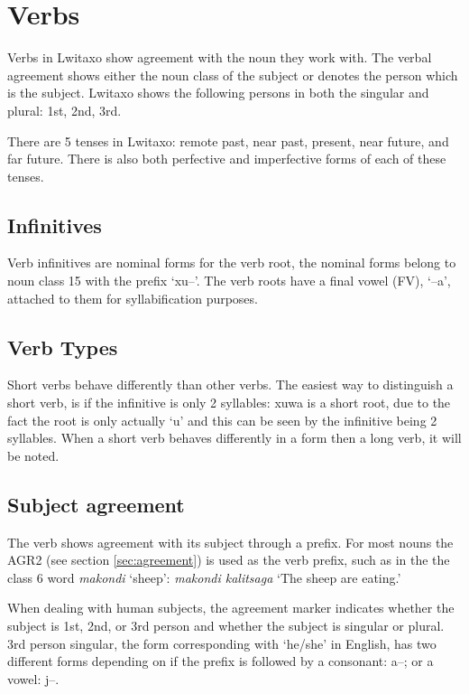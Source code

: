 \section{Verbs}

Verbs in Lwitaxo show agreement with the noun they work with.  The verbal agreement shows either the noun class of the subject or denotes the person which is the subject.  Lwitaxo shows the following persons in both the singular and plural: 1st, 2nd, 3rd.

There are 5 tenses in Lwitaxo: remote past, near past, present, near future, and far future.  There is also both perfective and imperfective forms of each of these tenses.

\subsection{Infinitives} \label{sec:infinitives}
Verb infinitives are nominal forms for the verb root, the nominal forms belong to noun class 15 with the prefix `xu--'.  The verb roots have a final vowel (FV), `--a', attached to them for syllabification purposes.\\

\subsection{Verb Types}
Short verbs behave differently than other verbs.  The easiest way to distinguish a short verb, is if the infinitive is only 2 syllables: xu\engma{}wa is a short root, due to the fact the root is only actually `\engma{}u' and this can be seen by the infinitive being 2 syllables.  When a short verb behaves differently in a form then a long verb, it will be noted.  

\subsection{Subject agreement}

The verb shows agreement with its subject through a prefix.  For most nouns the AGR2 (see section \ref{sec:agreement}) is used as the verb prefix, such as in the the class 6 word \emph{makondi} `sheep': \emph{makondi kalitsa\engma{}ga} `The sheep are eating.'

When dealing with human subjects, the agreement marker indicates whether the subject is 1st, 2nd, or 3rd person and whether the subject is singular or plural.  3rd person singular, the form corresponding with `he/she' in English, has two different forms depending on if the prefix is followed by a consonant: a--; or a vowel: j--.

